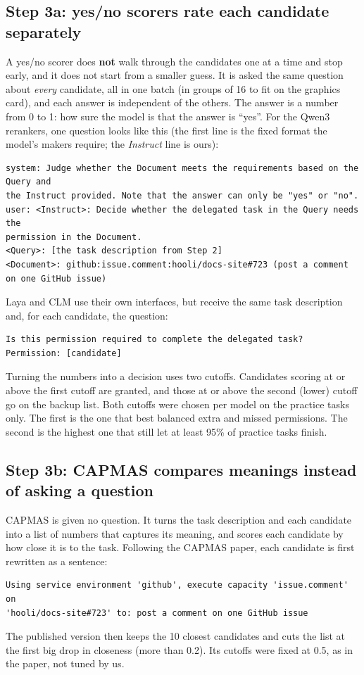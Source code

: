 \documentclass[11pt]{article}
\begin{document}
\subsection*{Step 3a: yes/no scorers rate each candidate separately}
A yes/no scorer does \textbf{not} walk through the candidates one at a time and stop early, and it does not
start from a smaller guess. It is asked the same question about \emph{every} candidate, all in one
batch (in groups of 16 to fit on the graphics card), and each answer is independent of the others. The
answer is a number from 0 to 1: how sure the model is that the answer is ``yes''. For the Qwen3 rerankers,
one question looks like this (the first line is the fixed format the model's makers require; the
\emph{Instruct} line is ours):
\begin{lstlisting}
system: Judge whether the Document meets the requirements based on the Query and
the Instruct provided. Note that the answer can only be "yes" or "no".
user: <Instruct>: Decide whether the delegated task in the Query needs the
permission in the Document.
<Query>: [the task description from Step 2]
<Document>: github:issue.comment:hooli/docs-site#723 (post a comment on one GitHub issue)
\end{lstlisting}
Laya and CLM use their own interfaces, but receive the same task description and, for each candidate, the question:
\begin{lstlisting}
Is this permission required to complete the delegated task? Permission: [candidate]
\end{lstlisting}
Turning the numbers into a decision uses two cutoffs. Candidates scoring at or above the first cutoff are
granted, and those at or above the second (lower) cutoff go on the backup list. Both cutoffs were chosen
per model on the practice tasks only. The first is the one that best balanced extra and missed
permissions. The second is the highest one that still let at least 95\% of practice tasks finish.

\subsection*{Step 3b: CAPMAS compares meanings instead of asking a question}
CAPMAS is given no question. It turns the task description and each candidate into a list of numbers
that captures its meaning, and scores each candidate by how close it is to the task. Following the CAPMAS
paper, each candidate is first rewritten as a sentence:
\begin{lstlisting}
Using service environment 'github', execute capacity 'issue.comment' on
'hooli/docs-site#723' to: post a comment on one GitHub issue
\end{lstlisting}
The published version then keeps the 10 closest candidates and cuts the list at the first big drop in
closeness (more than 0.2). Its cutoffs were fixed at 0.5, as in the paper, not tuned by us.
\end{document}
